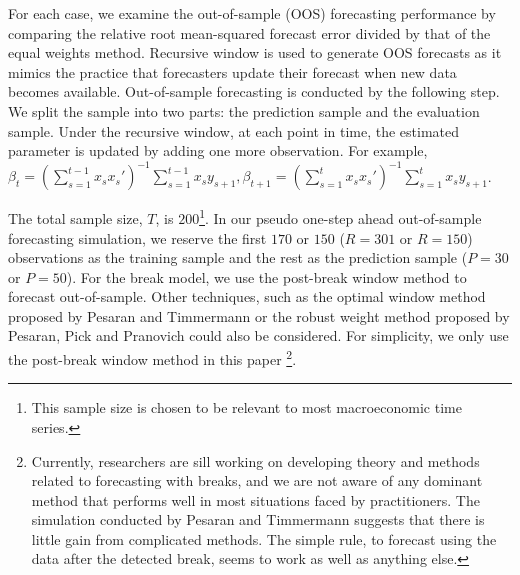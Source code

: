For each case, we examine the out-of-sample (OOS) forecasting performance by comparing the relative root mean-squared forecast error divided by that of the equal weights method. Recursive window is used to generate OOS forecasts as it mimics the practice that forecasters update their forecast when new data becomes available. Out-of-sample forecasting is conducted by the following step. We split the sample into two parts: the prediction sample and the evaluation sample. Under the recursive window, at each point in time, the estimated parameter is updated by adding one more observation. For example, $\beta_{t} = (\sum_{s=1}^{t-1} x_{s} x_{s}')^{-1}\sum_{s=1}^{t-1}x_{s}y_{s+1},\beta_{t+1} = (\sum_{s=1}^{t} x_{s} x_{s}')^{-1}\sum_{s=1}^{t}x_{s}y_{s+1}$.

The total sample size, $T$, is $200$\footnote{This sample size is chosen to be relevant to most macroeconomic time series.}. In our pseudo one-step ahead out-of-sample forecasting simulation, we reserve the first $170$ or $150$ ($R = 301$ or $R = 150$) observations as the training sample and the rest as the prediction sample ($P = 30$ or $P = 50$). For the break model, we use the post-break window method to forecast out-of-sample. Other techniques, such as the optimal window method proposed by Pesaran and Timmermann \cite{pesaran_timmermann_JE2007} or the robust weight method proposed by Pesaran, Pick and Pranovich \cite{pesaran_pick_pranovich_2011} could also be considered. For simplicity, we only use the post-break window method in this paper \footnote{Currently, researchers are sill working on developing theory and methods related to forecasting with breaks, and we are not aware of any dominant method that performs well in most situations faced by practitioners. The simulation conducted by Pesaran and Timmermann suggests that there is little gain from complicated methods. The simple rule, to forecast using the data after the detected break, seems to work as well as anything else.}.

